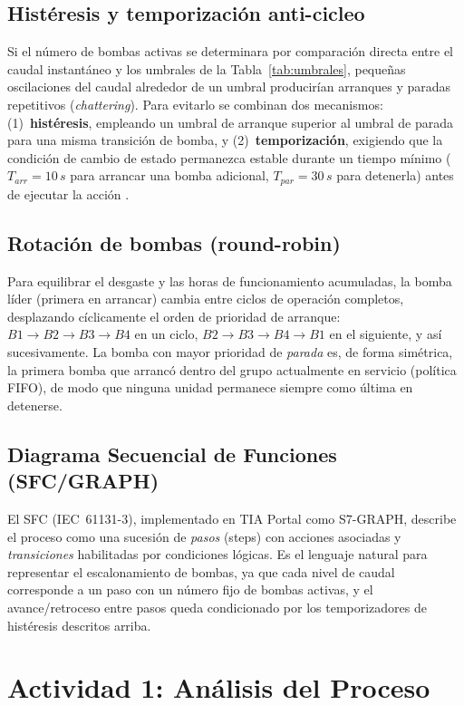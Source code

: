 \documentclass[conference]{IEEEtran}
\begin{document}
\subsection*{Histéresis y temporización anti-cicleo}
Si el número de bombas activas se determinara por comparación directa entre el caudal instantáneo y los umbrales de la Tabla~\ref{tab:umbrales}, pequeñas oscilaciones del caudal alrededor de un umbral producirían arranques y paradas repetitivos (\emph{chattering}). Para evitarlo se combinan dos mecanismos: (1)~\textbf{histéresis}, empleando un umbral de arranque superior al umbral de parada para una misma transición de bomba, y (2)~\textbf{temporización}, exigiendo que la condición de cambio de estado permanezca estable durante un tiempo mínimo ($T_{arr}=10\,\si{s}$ para arrancar una bomba adicional, $T_{par}=30\,\si{s}$ para detenerla) antes de ejecutar la acción \cite{iec61131_3}.

\subsection*{Rotación de bombas (round-robin)}
Para equilibrar el desgaste y las horas de funcionamiento acumuladas, la bomba líder (primera en arrancar) cambia entre ciclos de operación completos, desplazando cíclicamente el orden de prioridad de arranque: $B1{\to}B2{\to}B3{\to}B4$ en un ciclo, $B2{\to}B3{\to}B4{\to}B1$ en el siguiente, y así sucesivamente. La bomba con mayor prioridad de \emph{parada} es, de forma simétrica, la primera bomba que arrancó dentro del grupo actualmente en servicio (política FIFO), de modo que ninguna unidad permanece siempre como última en detenerse.

\subsection*{Diagrama Secuencial de Funciones (SFC/GRAPH)}
El SFC (IEC~61131-3), implementado en TIA Portal como S7-GRAPH, describe el proceso como una sucesión de \emph{pasos} (steps) con acciones asociadas y \emph{transiciones} habilitadas por condiciones lógicas. Es el lenguaje natural para representar el escalonamiento de bombas, ya que cada nivel de caudal corresponde a un paso con un número fijo de bombas activas, y el avance/retroceso entre pasos queda condicionado por los temporizadores de histéresis descritos arriba.

\section{Actividad 1: Análisis del Proceso}
\label{sec:actividad1}
\end{document}
